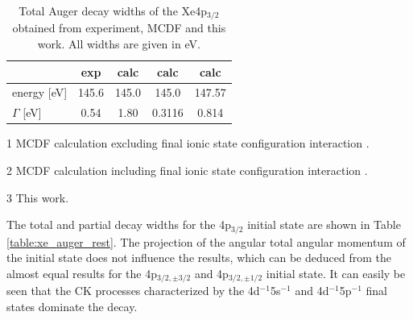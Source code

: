 \begin{table}[h]
 \centering
 \caption{Total Auger decay widths of the Xe4p$_{3/2}$ obtained from
          experiment, \ac{MCDF} and this work. All widths are given in \unit{eV}.}
\begin{threeparttable}
 \begin{tabular}{lcccc}
   \toprule
                        & exp   & calc \tnote{1} & calc\tnote{2} & calc\tnote{3} \\
   \midrule                                                                         
   energy [\unit{eV}]   & 145.6 &  145.0       &  145.0       &   147.57   \\
   $\Gamma$ [\unit{eV}] &  0.54 &  1.80        &  0.3116      &  0.814\\
   \bottomrule
 \end{tabular}
 \begin{tablenotes}\footnotesize
  \item[1] \ac{MCDF} calculation excluding final ionic state configuration
           interaction \cite{Heinaesmaeki04}.
  \item[2]{\ac{MCDF} calculation including final ionic state configuration
                 interaction \cite{Heinaesmaeki04}.}
  \item[3]{This work.}
 \end{tablenotes}
\end{threeparttable}
 \label{table:xe_auger_comp}
\end{table}
\normalsize

The total and partial decay widths for the 4p$_{3/2}$ initial state
are shown in Table \ref{table:xe_auger_rest}. The projection of the
angular total angular momentum of the initial state does not influence
the results, which can be deduced from the almost equal results for the
4p$_{3/2,\pm 3/2}$ and 4p$_{3/2,\pm 1/2}$ initial state. It can easily be seen that
the \acl{CK} processes characterized by the 4d$^{-1}$5s$^{-1}$ and
4d$^{-1}$5p$^{-1}$ final states dominate the decay.

